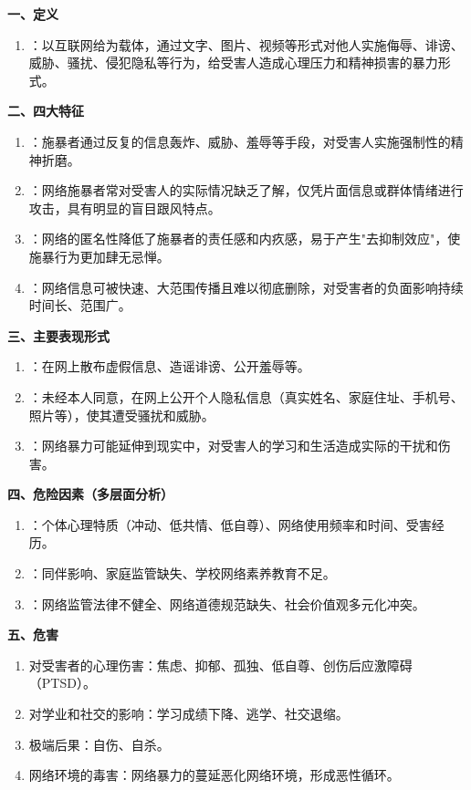 \begin{keybox}
\textbf{一、定义}
\begin{enumerate}[leftmargin=*]
    \item {}：以互联网给为载体，通过文字、图片、视频等形式对他人实施侮辱、诽谤、威胁、骚扰、侵犯隐私等行为，给受害人造成心理压力和精神损害的暴力形式。
\end{enumerate}

\textbf{二、四大特征}
\begin{enumerate}[leftmargin=*]
    \item {}：施暴者通过反复的信息轰炸、威胁、羞辱等手段，对受害人实施强制性的精神折磨。
    \item {}：网络施暴者常对受害人的实际情况缺乏了解，仅凭片面信息或群体情绪进行攻击，具有明显的盲目跟风特点。
    \item {}：网络的匿名性降低了施暴者的责任感和内疚感，易于产生"去抑制效应"，使施暴行为更加肆无忌惮。
    \item {}：网络信息可被快速、大范围传播且难以彻底删除，对受害者的负面影响持续时间长、范围广。
\end{enumerate}

\textbf{三、主要表现形式}
\begin{enumerate}[leftmargin=*]
    \item {}：在网上散布虚假信息、造谣诽谤、公开羞辱等。
    \item {}：未经本人同意，在网上公开个人隐私信息（真实姓名、家庭住址、手机号、照片等），使其遭受骚扰和威胁。
    \item {}：网络暴力可能延伸到现实中，对受害人的学习和生活造成实际的干扰和伤害。
\end{enumerate}

\textbf{四、危险因素（多层面分析）}
\begin{enumerate}[leftmargin=*]
    \item {}：个体心理特质（冲动、低共情、低自尊）、网络使用频率和时间、受害经历。
    \item {}：同伴影响、家庭监管缺失、学校网络素养教育不足。
    \item {}：网络监管法律不健全、网络道德规范缺失、社会价值观多元化冲突。
\end{enumerate}

\textbf{五、危害}
\begin{enumerate}[leftmargin=*]
    \item 对受害者的心理伤害：焦虑、抑郁、孤独、低自尊、创伤后应激障碍（PTSD）。
    \item 对学业和社交的影响：学习成绩下降、逃学、社交退缩。
    \item 极端后果：自伤、自杀。
    \item 网络环境的毒害：网络暴力的蔓延恶化网络环境，形成恶性循环。
\end{enumerate}


\end{keybox}
